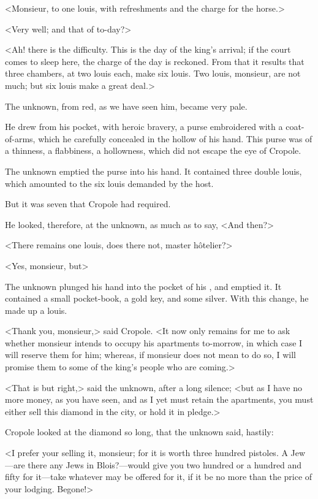 <Monsieur, to one louis, with refreshments and the charge for the horse.>

<Very well; and that of to-day?>

<Ah! there is the difficulty. This is the day of the king's arrival; if the court comes to sleep here, the charge of the day is reckoned. From that it results that three chambers, at two louis each, make six louis. Two louis, monsieur, are not much; but six louis make a great deal.>

The unknown, from red, as we have seen him, became very pale.

He drew from his pocket, with heroic bravery, a purse embroidered with a coat-of-arms, which he carefully concealed in the hollow of his hand. This purse was of a thinness, a flabbiness, a hollowness, which did not escape the eye of Cropole.

The unknown emptied the purse into his hand. It contained three double louis, which amounted to the six louis demanded by the host.

But it was seven that Cropole had required.

He looked, therefore, at the unknown, as much as to say, <And then?>

<There remains one louis, does there not, master hôtelier?>

<Yes, monsieur, but\longdash>

The unknown plunged his hand into the pocket of his , and emptied it. It contained a small pocket-book, a gold key, and some silver. With this change, he made up a louis.

<Thank you, monsieur,> said Cropole. <It now only remains for me to ask whether monsieur intends to occupy his apartments to-morrow, in which case I will reserve them for him; whereas, if monsieur does not mean to do so, I will promise them to some of the king's people who are coming.>

<That is but right,> said the unknown, after a long silence; <but as I have no more money, as you have seen, and as I yet must retain the apartments, you must either sell this diamond in the city, or hold it in pledge.>

Cropole looked at the diamond so long, that the unknown said, hastily:

<I prefer your selling it, monsieur; for it is worth three hundred pistoles. A Jew—are there any Jews in Blois?—would give you two hundred or a hundred and fifty for it—take whatever may be offered for it, if it be no more than the price of your lodging. Begone!>

